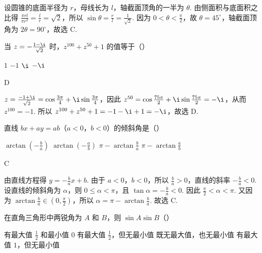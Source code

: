 \documentclass[UTF8,a4paper,oneside,11pt]{ctexbook}
\begin{document}
\begin{solution}
设圆锥的底面半径为 \(r\)，母线长为 \(l\)，轴截面顶角的一半为
\(\theta\). 由侧面积与底面积之比得
\(\frac{\pi rl}{\pi r^2}=\frac{l}{r}=\sqrt{2}\)，所以
\(\sin\theta=\frac{r}{l}=\frac{1}{\sqrt{2}}\). 因为
\(0<\theta<\frac{\pi}{2}\)，故 \(\theta=45^\circ\)，轴截面顶角为
\(2\theta=90^\circ\)，故选 C.
\end{solution}

\begin{problem}
当 \(z = -\frac{1 - \i}{\sqrt{2}}\) 时，\(z^{100} + z^{50} + 1\) 的值等于（\quad）

\choices
    {\(1\)}
    {\(-1\)}
    {\(\i\)}
    {\(-\i\)}
\end{problem}

\begin{answer}
D
\end{answer}

\begin{solution}
\(z=\frac{-1+\i}{\sqrt{2}}=\cos\frac{3\pi}{4}+\i\sin\frac{3\pi}{4}\)，因此
\(z^{50}=\cos\frac{75\pi}{2}+\i\sin\frac{75\pi}{2}=-\i\)，从而
\(z^{100}=-1\). 所以
\(z^{100}+z^{50}+1=-1-\i+1=-\i\)，故选 D.
\end{solution}

\begin{problem}
直线 \(bx + ay = ab\)（\(a < 0\)，\(b < 0\)）的倾斜角是（\quad）

\choices
    {\(\arctan \left(-\frac{b}{a}\right)\)}
    {\(\arctan \left(-\frac{a}{b}\right)\)}
    {\(\pi - \arctan \frac{b}{a}\)}
    {\(\pi - \arctan \frac{a}{b}\)}
\end{problem}

\begin{answer}
C
\end{answer}

\begin{solution}
由直线方程得 \(y=-\frac{b}{a}x+b\). 由于 \(a<0\)，\(b<0\)，所以
\(\frac{b}{a}>0\)，直线的斜率 \(-\frac{b}{a}<0\). 设直线的倾斜角为
\(\alpha\)，则 \(0\leqslant\alpha<\pi\)，且 \(\tan\alpha=-\frac{b}{a}<0\).
因此 \(\frac{\pi}{2}<\alpha<\pi\). 又因为
\(\arctan\frac{b}{a}\in\left(0,\frac{\pi}{2}\right)\)，所以
\(\alpha=\pi-\arctan\frac{b}{a}\).
故选 C.
\end{solution}

\begin{problem}
在直角三角形中两锐角为 \(A\) 和 \(B\)，则 \(\sin A \sin B\)（\quad）

\choices
    {有最大值 \(\frac{1}{2}\) 和最小值 \(0\)}
    {有最大值 \(\frac{1}{2}\)，但无最小值}
    {既无最大值，也无最小值}
    {有最大值 \(1\)，但无最小值}
\end{problem}
\end{document}
